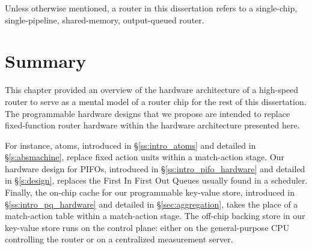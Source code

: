 Unless otherwise mentioned, a router in this dissertation refers to a
single-chip, single-pipeline, shared-memory, output-queued router.

\section{Summary}
This chapter provided an overview of the hardware architecture of a high-speed
router to serve as a mental model of a router chip for the rest of this
dissertation.  The programmable hardware designs that we propose are intended
to replace fixed-function router hardware within the hardware architecture
presented here.

For instance, atoms, introduced in \S\ref{ss:intro_atoms} and detailed in
\S\ref{s:absmachine}, replace fixed action units within a match-action stage.
 Our hardware design for PIFOs, introduced in
\S\ref{ss:intro_pifo_hardware} and detailed in \S\ref{s:design}, replaces the
First In First Out Queues usually found in a scheduler. Finally, the on-chip
cache for our programmable key-value store, introduced in
\S\ref{ss:intro_pq_hardware} and detailed in \S\ref{sec:aggregation}, takes the
place of a match-action table within a match-action stage. The off-chip backing
store in our key-value store runs on the control plane: either on the
general-purpose CPU controlling the router or on a centralized measurement
server.
